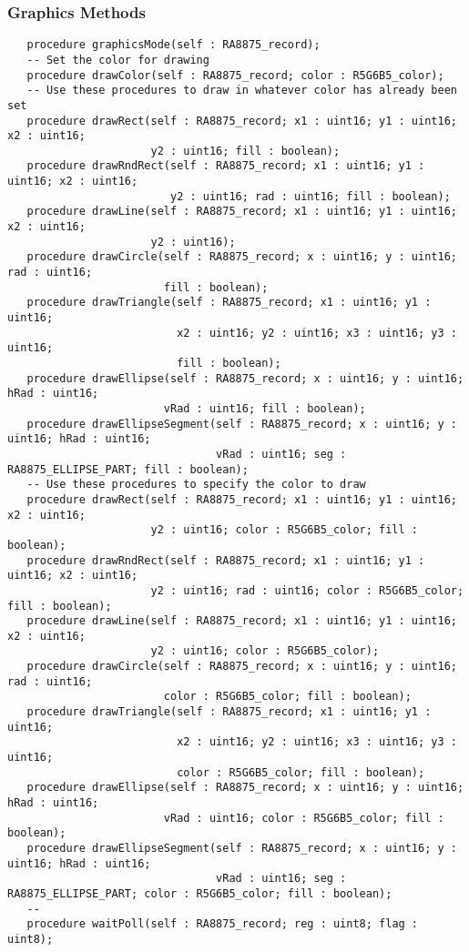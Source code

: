 \documentclass[10pt, openany]{book}
\begin{document}
\subsubsection{Graphics Methods}
\begin{lstlisting}
   procedure graphicsMode(self : RA8875_record);
   -- Set the color for drawing
   procedure drawColor(self : RA8875_record; color : R5G6B5_color);
   -- Use these procedures to draw in whatever color has already been set
   procedure drawRect(self : RA8875_record; x1 : uint16; y1 : uint16; x2 : uint16;
                      y2 : uint16; fill : boolean);
   procedure drawRndRect(self : RA8875_record; x1 : uint16; y1 : uint16; x2 : uint16;
                         y2 : uint16; rad : uint16; fill : boolean);
   procedure drawLine(self : RA8875_record; x1 : uint16; y1 : uint16; x2 : uint16;
                      y2 : uint16);
   procedure drawCircle(self : RA8875_record; x : uint16; y : uint16; rad : uint16;
                        fill : boolean);
   procedure drawTriangle(self : RA8875_record; x1 : uint16; y1 : uint16;
                          x2 : uint16; y2 : uint16; x3 : uint16; y3 : uint16;
                          fill : boolean);
   procedure drawEllipse(self : RA8875_record; x : uint16; y : uint16; hRad : uint16;
                        vRad : uint16; fill : boolean);
   procedure drawEllipseSegment(self : RA8875_record; x : uint16; y : uint16; hRad : uint16;
                                vRad : uint16; seg : RA8875_ELLIPSE_PART; fill : boolean);
   -- Use these procedures to specify the color to draw
   procedure drawRect(self : RA8875_record; x1 : uint16; y1 : uint16; x2 : uint16;
                      y2 : uint16; color : R5G6B5_color; fill : boolean);
   procedure drawRndRect(self : RA8875_record; x1 : uint16; y1 : uint16; x2 : uint16;
                      y2 : uint16; rad : uint16; color : R5G6B5_color; fill : boolean);
   procedure drawLine(self : RA8875_record; x1 : uint16; y1 : uint16; x2 : uint16;
                      y2 : uint16; color : R5G6B5_color);
   procedure drawCircle(self : RA8875_record; x : uint16; y : uint16; rad : uint16;
                        color : R5G6B5_color; fill : boolean);
   procedure drawTriangle(self : RA8875_record; x1 : uint16; y1 : uint16;
                          x2 : uint16; y2 : uint16; x3 : uint16; y3 : uint16;
                          color : R5G6B5_color; fill : boolean);
   procedure drawEllipse(self : RA8875_record; x : uint16; y : uint16; hRad : uint16;
                        vRad : uint16; color : R5G6B5_color; fill : boolean);
   procedure drawEllipseSegment(self : RA8875_record; x : uint16; y : uint16; hRad : uint16;
                                vRad : uint16; seg : RA8875_ELLIPSE_PART; color : R5G6B5_color; fill : boolean);
   --
   procedure waitPoll(self : RA8875_record; reg : uint8; flag : uint8);
\end{lstlisting}
\end{document}
